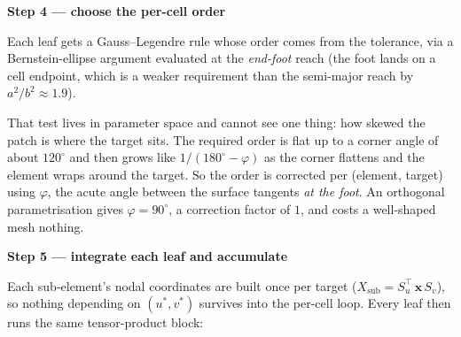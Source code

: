 \documentclass[11pt]{article}
\newcommand{\stepbox}[1]{%
  \par\medskip\noindent\textbf{\color{cElem}#1}\par\nopagebreak\smallskip}
\begin{document}
\stepbox{Step 4 --- choose the per-cell order}

Each leaf gets a Gauss--Legendre rule whose order comes from the tolerance, via a Bernstein-ellipse
argument evaluated at the \emph{end-foot} reach (the foot lands on a cell endpoint, which is a
weaker requirement than the semi-major reach by $a^2/b^2\approx1.9$).

That test lives in parameter space and cannot see one thing: how skewed the patch is where the
target sits. The required order is flat up to a corner angle of about $120^\circ$ and then grows
like $1/(180^\circ-\varphi)$ as the corner flattens and the element wraps around the target. So
the order is corrected per (element, target) using $\varphi$, the acute angle between the surface
tangents \emph{at the foot}. An orthogonal parametrisation gives $\varphi=90^\circ$, a correction
factor of $1$, and costs a well-shaped mesh nothing.

\begin{center}
\begin{minipage}{\textwidth}\centering
{}
\end{minipage}
\end{center}

\stepbox{Step 5 --- integrate each leaf and accumulate}

Each sub-element's nodal coordinates are built once per target
($X_{\text{sub}} = S_u^{\!\top}\,\mathbf{x}\,S_v$), so nothing depending on $(u^\ast,v^\ast)$
survives into the per-cell loop. Every leaf then runs the same tensor-product block:
\end{document}

